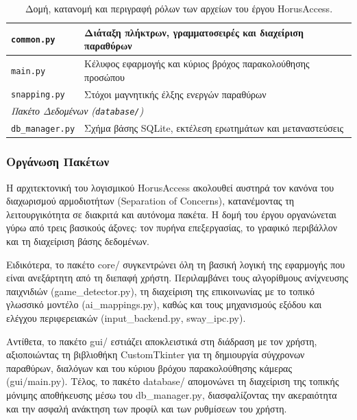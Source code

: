 \documentclass[twoside, a4paper, 11pt]{article}
\newcommand{\textlatin}[1]{\textenglish{#1}}
\begin{document}
\begin{table}[htbp]
\begin{tabular}{|l|p{8.5cm}|}
        \texttt{common.py} & Διάταξη πλήκτρων, γραμματοσειρές και διαχείριση παραθύρων \\ \hline
        \texttt{main.py} & Κέλυφος εφαρμογής και κύριος βρόχος παρακολούθησης προσώπου \\ \hline
        \texttt{snapping.py} & Στόχοι μαγνητικής έλξης ενεργών παραθύρων \\ \hline
        \multicolumn{2}{l|}{\textit{Πακέτο Δεδομένων (\texttt{database/})}} \\ \hline
        \texttt{db\_manager.py} & Σχήμα βάσης SQLite, εκτέλεση ερωτημάτων και μεταναστεύσεις \\ \hline
    \end{tabular}
    \caption{Δομή, κατανομή και περιγραφή ρόλων των αρχείων του έργου \textlatin{HorusAccess}.}
    \label{tab:project_structure}
\end{table}

\vspace{0.3cm}

\subsubsection{Οργάνωση Πακέτων}

Η αρχιτεκτονική του λογισμικού \textlatin{HorusAccess} ακολουθεί αυστηρά τον κανόνα του διαχωρισμού αρμοδιοτήτων (\textlatin{Separation of Concerns}), κατανέμοντας τη λειτουργικότητα σε διακριτά και αυτόνομα πακέτα. Η δομή του έργου οργανώνεται γύρω από τρεις βασικούς άξονες: τον πυρήνα επεξεργασίας, το γραφικό περιβάλλον και τη διαχείριση βάσης δεδομένων.

Ειδικότερα, το πακέτο \textlatin{core/} συγκεντρώνει όλη τη βασική λογική της εφαρμογής που είναι ανεξάρτητη από τη διεπαφή χρήστη. Περιλαμβάνει τους αλγορίθμους ανίχνευσης παιχνιδιών (\textlatin{game\_detector.py}), τη διαχείριση της επικοινωνίας με το τοπικό γλωσσικό μοντέλο (\textlatin{ai\_mappings.py}), καθώς και τους μηχανισμούς εξόδου και ελέγχου περιφερειακών (\textlatin{input\_backend.py}, \textlatin{sway\_ipc.py}). 

Αντίθετα, το πακέτο \textlatin{gui/} εστιάζει αποκλειστικά στη διάδραση με τον χρήστη, αξιοποιώντας τη βιβλιοθήκη \textlatin{CustomTkinter} για τη δημιουργία σύγχρονων παραθύρων, διαλόγων και του κύριου βρόχου παρακολούθησης κάμερας (\textlatin{gui/main.py}). Τέλος, το πακέτο \textlatin{database/} απομονώνει τη διαχείριση της τοπικής μόνιμης αποθήκευσης μέσω του \textlatin{db\_manager.py}, διασφαλίζοντας την ακεραιότητα και την ασφαλή ανάκτηση των προφίλ και των ρυθμίσεων του χρήστη.
\end{document}
